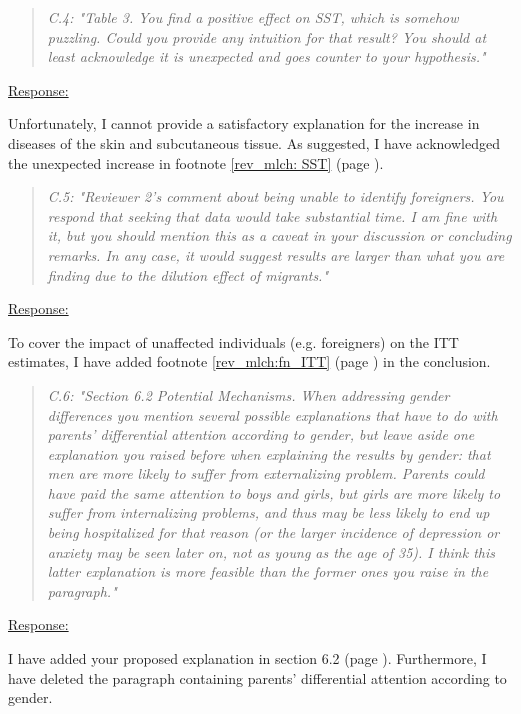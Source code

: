 \bigskip
{}
\begin{quote}
	\textit{C.4: "Table 3. You find a positive effect on SST, which is somehow puzzling. Could you provide any intuition for that result? You should at least acknowledge it is unexpected and goes counter to your hypothesis."}
\end{quote}
\underline{Response:} 

Unfortunately, I cannot provide a satisfactory explanation for the increase in diseases of the skin and subcutaneous tissue. As suggested, I have acknowledged the unexpected increase in footnote \ref{rev_mlch: SST} (page \pageref{rev_mlch: SST}).








\bigskip
{}
\begin{quote}
	\textit{C.5: "Reviewer 2’s comment about being unable to identify foreigners. You respond that seeking that data would take substantial time. I am fine with it, but you should mention this as a caveat in your discussion or concluding remarks. In any case, it would suggest results are larger than what you are finding due to the dilution effect of migrants."}
\end{quote}
\underline{Response:} 



To cover the impact of unaffected individuals (e.g. foreigners) on the ITT estimates, I have added footnote \ref{rev_mlch:fn_ITT} (page \pageref{rev_mlch:fn_ITT}) in the conclusion.



\bigskip
{}
\begin{quote}
	\textit{C.6: "Section 6.2 Potential Mechanisms. When addressing gender differences you mention several possible explanations that have to do with parents' differential attention according to gender, but leave aside one explanation you raised before when explaining the results by gender: that men are more likely to suffer from externalizing problem. Parents could have paid the same attention to boys and girls, but girls are more likely to suffer from internalizing problems, and thus may be less likely to end up being hospitalized for that reason (or the larger incidence of depression or anxiety may be seen later on, not as young as the age of 35). I think this latter explanation is more feasible than the former ones you raise in the paragraph."}
\end{quote}
\underline{Response:}

I have added your proposed explanation in section 6.2 (page \pageref{rev_mlch:gender_effects}). Furthermore, I have deleted the paragraph containing parents' differential attention according to gender.


